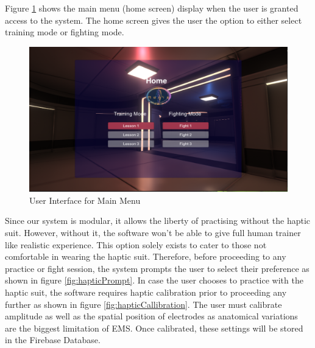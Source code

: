 Figure \ref{fig:homeScreen} shows the main menu (home screen) display when the user is granted access to the system. The home screen gives the user the option to either select training mode or fighting mode. 

\begin{figure}
    \centering
    \includegraphics[scale=.5]{images/screens/home.png}
    \caption{User Interface for Main Menu}
    \label{fig:homeScreen}
\end{figure}

Since our system is modular, it allows the liberty of practising without the haptic suit. However, without it, the software won't be able to give full human trainer like realistic experience. This option solely exists to cater to those not comfortable in wearing the haptic suit. Therefore, before proceeding to any practice or fight session, the system prompts the user to select their preference as shown in figure \ref{fig:hapticPrompt}. In case the user chooses to practice with the haptic suit, the software requires haptic calibration prior to proceeding any further as shown in figure \ref{fig:hapticCallibration}. The user must calibrate amplitude as well as the spatial position of electrodes as anatomical variations are the biggest limitation of EMS. Once calibrated, these settings will be stored in the Firebase Database. 

